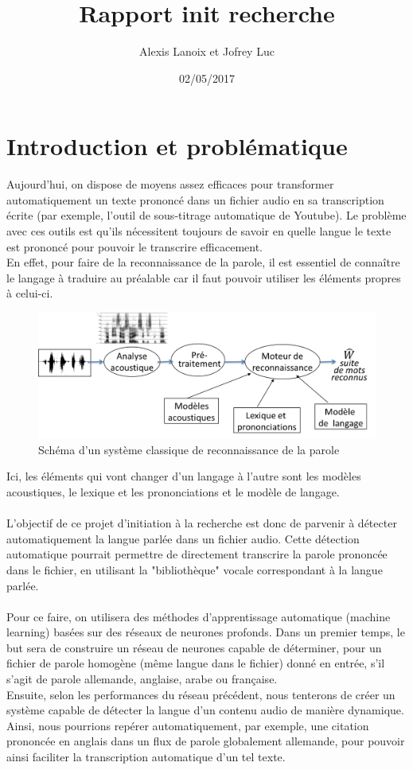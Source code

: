 \documentclass{article}
\author{Alexis Lanoix et Jofrey Luc}
\title{Rapport init recherche}
\date{02/05/2017}
\newcommand\pythonstyle{\lstset{
  language=Python,
  backgroundcolor=\color{white}, 
  basicstyle=\ttm\small,
  emph={MyClass,__init__},          
  emphstyle=\ttb\color{deepred},    
  commentstyle=\color{red}, 
  frame=tb,                         
  showstringspaces=false,
  inputencoding=utf8,
  extendedchars=true,
  literate={é}{{\'e}}1 {î}{{\^i}}1 {ê}{{\^e}}1 {è}{{\`e}}1 {à}{{\`a}}1
}}
\begin{document}
\tableofcontents
\newpage

\newcommand\pythonexternal[2][]{{
\pythonstyle
}}

\section{Introduction et problématique}

Aujourd'hui, on dispose de moyens assez efficaces pour transformer automatiquement un texte prononcé dans un fichier audio en sa transcription écrite (par exemple, l'outil de sous-titrage automatique de Youtube). Le problème avec ces outils est qu'ils nécessitent toujours de savoir en quelle langue le texte est prononcé pour pouvoir le transcrire efficacement.\\
En effet, pour faire de la reconnaissance de la parole, il est essentiel de connaître le langage à traduire au préalable car il faut pouvoir utiliser les éléments propres à celui-ci.\\

\begin{figure}[h]
  \centerline{\includegraphics[scale=0.6]{img/schema_reco.png}}
  \caption{Schéma d'un système classique de reconnaissance de la parole}
\end{figure}

\noindent Ici, les éléments qui vont changer d'un langage à l'autre sont les modèles acoustiques, le lexique et les prononciations et le modèle de langage.\\
 \\
L'objectif de ce projet d'initiation à la recherche est donc de parvenir à détecter automatiquement la langue parlée dans un fichier audio. Cette détection automatique pourrait permettre de directement transcrire la parole prononcée dans le fichier, en utilisant la "bibliothèque" vocale correspondant à la langue parlée.\\
 \\
Pour ce faire, on utilisera des méthodes d'apprentissage automatique (machine learning) basées sur des réseaux de neurones profonds.
Dans un premier temps, le but sera de construire un réseau de neurones capable de déterminer, pour un fichier de parole homogène (même langue dans le fichier) donné en entrée, s'il s'agit de parole  allemande, anglaise, arabe ou française.\\
Ensuite, selon les performances du réseau précédent, nous tenterons de créer un système capable de détecter la langue d'un contenu audio de manière dynamique. Ainsi, nous pourrions repérer automatiquement, par exemple, une citation prononcée en anglais dans un flux de parole globalement allemande, pour pouvoir ainsi faciliter la transcription automatique d'un tel texte.
\end{document}
